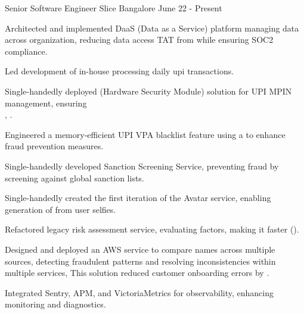 \begin{cventries}
  \cventry
    {Senior Software Engineer}
    {Slice}
    {Bangalore}
    {June 22 - Present}
    {
      \begin{cvitems}
        \item {Architected and implemented DaaS (Data as a Service) platform managing  data across organization,
        reducing data access TAT from  while ensuring SOC2 compliance.}
        \item {Led development of in-house  processing  daily upi transactions.}
        \item {Single-handedly deployed (Hardware Security Module) solution for UPI MPIN management, ensuring 
          \\ ,
        .}
        \item {Engineered a memory-efficient UPI VPA blacklist feature using a  to enhance fraud prevention measures.}
        \item {Single-handedly developed Sanction Screening Service, preventing fraud by screening against  global sanction lists.}
        \item {Single-handedly created the first iteration of the Avatar service, enabling  generation of  from user selfies.}
        \item {Refactored legacy risk assessment service, evaluating  factors, making it  faster ().}
        \item {Designed and deployed an AWS  service to compare names across multiple sources,
          detecting fraudulent patterns and resolving inconsistencies within multiple services, This solution reduced customer onboarding errors by .}
        \item {Integrated Sentry, APM, and VictoriaMetrics for observability, enhancing monitoring and diagnostics.}
      \end{cvitems}
    }
  

\end{cventries}
